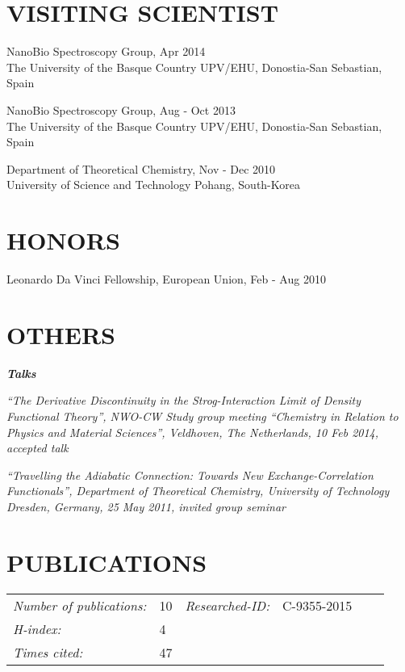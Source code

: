 \documentclass[line,margin]{res}
\begin{document}
\begin{resume}
\section{VISITING SCIENTIST}    NanoBio Spectroscopy Group, \hfill Apr 2014\\
                The University of the Basque Country UPV/EHU, Donostia-San Sebastian, Spain
                
                NanoBio Spectroscopy Group, \hfill Aug - Oct 2013\\
                The University of the Basque Country UPV/EHU, Donostia-San Sebastian, Spain
                
                Department of Theoretical Chemistry, \hfill Nov - Dec 2010\\
				University of Science and Technology Pohang, South-Korea   

\section{HONORS} Leonardo Da Vinci Fellowship, European Union, Feb - Aug 2010

\section{OTHERS}   	{\sl\textbf{Talks}}\smallskip\\
					\hspace*{.5cm}\parbox[t]{12.5cm}{\sl ``The Derivative Discontinuity in the Strog-Interaction Limit of Density Functional Theory'', NWO-CW Study group meeting ``Chemistry in Relation to Physics and Material Sciences'', Veldhoven, The Netherlands, 10 Feb 2014, accepted talk}

					\hspace*{.5cm}\parbox[t]{12.5cm}{\sl ``Travelling the Adiabatic Connection: Towards New Exchange-Correlation Functionals'', Department of Theoretical Chemistry, University of Technology Dresden, Germany, 25 May 2011, invited group seminar}
										
\section{PUBLICATIONS} 
					\begin{tabular}{llllll}
						{\sl Number of publications:}	& 10 & \textit{Researched-ID:}	& C-9355-2015\smallskip\\
						{\sl H-index:} 	& 4						\smallskip\\
						{\sl Times cited:} 	& 47
						

\end{tabular}
\end{resume}
\end{document}
